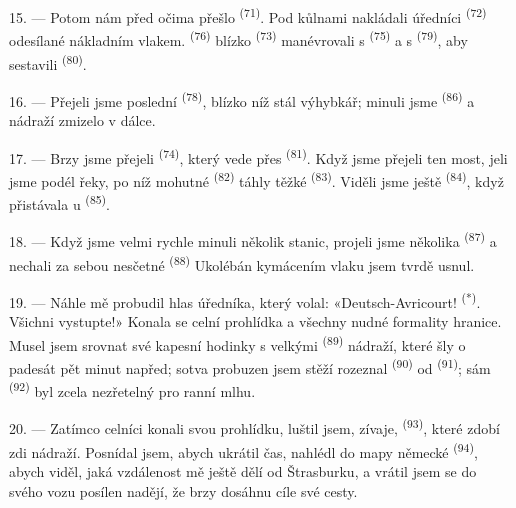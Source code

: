 15. --- Potom nám před očima přešlo 
\textsuperscript{(71)}. Pod kůlnami nakládali úředníci 
\textsuperscript{(72)} odesílané nákladním vlakem. 
\textsuperscript{(76)} blízko  \textsuperscript{(73)} manévrovali s
 \textsuperscript{(75)} a s 
\textsuperscript{(79)}, aby sestavili  \textsuperscript{(80)}.

16. --- Přejeli jsme poslední  \textsuperscript{(78)}, blízko níž stál
výhybkář; minuli jsme  \textsuperscript{(86)} a nádraží zmizelo v
dálce.

17. --- Brzy jsme přejeli  \textsuperscript{(74)}, který vede přes
 \textsuperscript{(81)}. Když jsme přejeli ten most, jeli jsme podél
řeky, po níž mohutné  \textsuperscript{(82)} táhly těžké
 \textsuperscript{(83)}. Viděli jsme ještě 
\textsuperscript{(84)}, když přistávala u  \textsuperscript{(85)}.

18. --- Když jsme velmi rychle minuli několik stanic, projeli jsme několika
 \textsuperscript{(87)} a nechali za sebou nesčetné 
\textsuperscript{(88)}  Ukolébán kymácením vlaku jsem tvrdě usnul.

\VUsaut{3.0mm}
\VUsaut{3.0mm}

19. --- Náhle mě probudil hlas úředníka, který volal: «Deutsch-Avricourt!
\textsuperscript{(*)}. Všichni vystupte!» Konala se celní prohlídka a všechny nudné
formality hranice. Musel jsem srovnat své kapesní hodinky s velkými
 \textsuperscript{(89)} nádraží, které šly o padesát pět minut
napřed; sotva probuzen jsem stěží rozeznal 
\textsuperscript{(90)} od  \textsuperscript{(91)}; sám
 \textsuperscript{(92)} byl zcela nezřetelný pro ranní mlhu.

20. --- Zatímco celníci konali svou prohlídku, luštil jsem, zívaje, 
\textsuperscript{(93)}, které zdobí zdi nádraží. Posnídal jsem, abych ukrátil čas,
nahlédl do mapy německé  \textsuperscript{(94)}, abych viděl, jaká
vzdálenost mě ještě dělí od Štrasburku, a vrátil jsem se do svého vozu posílen nadějí,
že brzy dosáhnu cíle své cesty.
